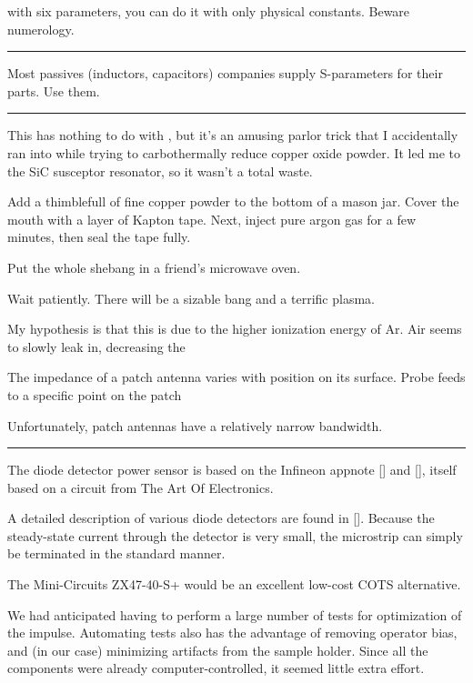 \documentclass[paper.tex]{subfiles}
\begin{document}
with six parameters, you can do it with only physical constants. Beware numerology.

\rule{\linewidth}{0.2pt}

Most passives (inductors, capacitors) companies supply S-parameters for their parts. Use them.

\rule{\linewidth}{0.2pt}

This has nothing to do with , but it's an amusing parlor trick that I accidentally ran into while trying to carbothermally reduce copper oxide powder. It led me to the SiC susceptor resonator, so it wasn't a total waste.

Add a thimblefull of fine copper powder to the bottom of a mason jar. Cover the mouth with a layer of Kapton tape. Next, inject pure argon gas for a few minutes, then seal the tape fully.

Put the whole shebang in a friend's microwave oven. 

Wait patiently. There will be a sizable bang and a terrific plasma.

My hypothesis is that this is due to the higher ionization energy of Ar. Air seems to slowly leak in, decreasing the 



The impedance of a patch antenna varies with position on its surface. Probe feeds to a specific point on the patch

Unfortunately, patch antennas have a relatively narrow bandwidth.

\rule{\linewidth}{0.2pt}



The diode detector power sensor is based on the Infineon appnote [] and [], itself based on a circuit from The Art Of Electronics. 

A detailed description of various diode detectors are found in []. Because the steady-state current through the detector is very small, the microstrip can simply be terminated in the standard manner.

The Mini-Circuits ZX47-40-S+ would be an excellent low-cost COTS alternative.

\printbibliography[heading=none, title={}, keyword={rectifier}]


We had anticipated having to perform a large number of tests for optimization of the impulse. Automating tests also has the advantage of removing operator bias, and (in our case) minimizing artifacts from the sample holder. Since all the components were already computer-controlled, it seemed little extra effort.
\end{document}
